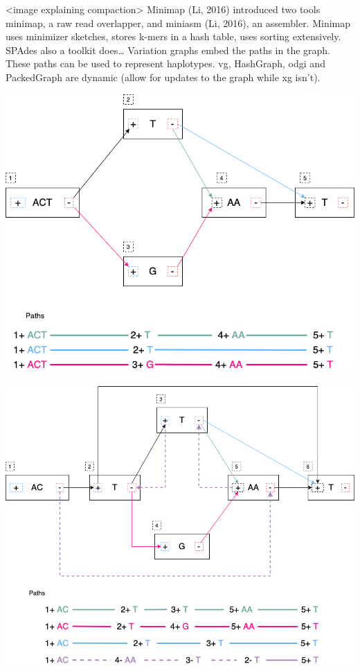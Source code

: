 \documentclass[11pt]{article}
\begin{document}
<image explaining compaction>
Minimap (Li, 2016) introduced two tools minimap, a raw read overlapper, and miniasm (Li, 2016), an assembler. Minimap uses minimizer sketches, stores k-mers in a hash table, uses sorting extensively.
SPAdes  also a toolkit does…
Variation graphs embed the paths in the graph. These paths can be used to represent haplotypes. vg, HashGraph, odgi and PackedGraph are dynamic (allow for updates to the graph while xg isn’t).

\begin{center}
\includegraphics[width=.9\linewidth]{./assets/images/Variation Graph-Page-1.png}
\end{center}

\begin{center}
\includegraphics[width=.9\linewidth]{./assets/images/Variation Graph-Page-2.png}
\end{center}
\end{document}
